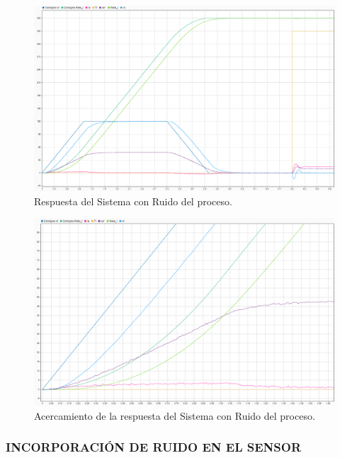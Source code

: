 \documentclass{article}
\begin{document}
\begin{sloppypar}
\begin{figure}[H]
    \centering
    \includegraphics[width=1\textwidth]{Respuesta del Sistema con Ruido del proceso}
    \caption{Respuesta del Sistema con Ruido del proceso.}
    \label{fig:Respuesta del Sistema con Ruido del proceso}
\end{figure}

\begin{figure}[H]
    \centering
    \includegraphics[width=1\textwidth]{Acercamiento de la respuesta del Sistema con Ruido del proceso}
    \caption{Acercamiento de la respuesta del Sistema con Ruido del proceso.}
    \label{fig:Acercamiento de la respuesta del Sistema con Ruido del proceso}
\end{figure}

\subsubsection{INCORPORACIÓN DE RUIDO EN EL SENSOR}
\label{sec:INCORPORACIÓN DE RUIDO EN EL SENSOR}


\end{sloppypar}
\end{document}
